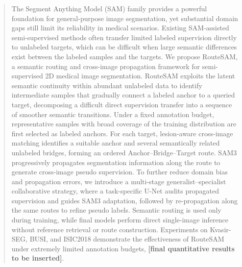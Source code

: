 \documentclass[a4paper,fleqn]{cas-dc}
\begin{document}
\fntext[1]{}


\begin{abstract} The Segment Anything Model (SAM) family provides a powerful foundation for general-purpose image segmentation, yet substantial domain gaps still limit its reliability in medical scenarios. Existing SAM-assisted semi-supervised methods often transfer limited labeled supervision directly to unlabeled targets, which can be difficult when large semantic differences exist between the labeled samples and the targets. We propose RouteSAM, a semantic routing and cross-image propagation framework for semi-supervised 2D medical image segmentation. RouteSAM exploits the latent semantic continuity within abundant unlabeled data to identify intermediate samples that gradually connect a labeled anchor to a queried target, decomposing a difficult direct supervision transfer into a sequence of smoother semantic transitions. Under a fixed annotation budget, representative samples with broad coverage of the training distribution are first selected as labeled anchors. For each target, lesion-aware cross-image matching identifies a suitable anchor and several semantically related unlabeled bridges, forming an ordered Anchor--Bridge--Target route. SAM3 progressively propagates segmentation information along the route to generate cross-image pseudo supervision. To further reduce domain bias and propagation errors, we introduce a multi-stage generalist--specialist collaborative strategy, where a task-specific U-Net audits propagated supervision and guides SAM3 adaptation, followed by re-propagation along the same routes to refine pseudo labels. Semantic routing is used only during training, while final models perform direct single-image inference without reference retrieval or route construction. Experiments on Kvasir-SEG, BUSI, and ISIC2018 demonstrate the effectiveness of RouteSAM under extremely limited annotation budgets, \textbf{[final quantitative results to be inserted]}. \end{abstract}

\end{document}
